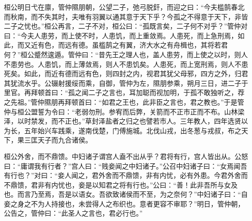 \documentclass[]{article}
\begin{document}
桓公明日弋在廪，管仲隰朋朝，公望二子，弛弓脱釬，而迎之曰：``今夫槛鹄春北而秋南，而不失其时，夫唯有羽翼以通其意于天下乎？今孤之不得意于天下，非皆二子之忧也。''桓公再言，二子不对，桓公曰：``孤既言矣，二子何不对乎？''管仲对曰：``今夫人患劳，而上使不时，人患饥，而上重敛焉。人患死，而上急刑焉，如此，而又近有色，而远有德。虽槛鹄之有翼，济大水之有舟楫也，其将若君何？''桓公蹙然逡遁。管仲曰：``昔先王之理人也，盖人患劳，而上使之以时，则人不患劳也。人患饥，而上薄敛焉，则人不患饥矣。人患死，而上宽刑焉，则人不患死矣。如此，而近有德而远有色，则四封之内，视君其犹父母邪，四方之外，归君其犹流水乎。公辍射援绥而乘，自御，管仲为左，隰朋参乘，朔月三日，进二子于里官。再拜顿首曰：``孤之闻二子之言也，耳加聪而视加明，于孤不敢独听之，荐之先祖。''管仲隰朋再拜顿首曰：``如君之王也，此非臣之言也，君之教也。''于是管仲与桓公盟誓为令曰：``老弱勿刑。参宥而后弊，关箭而不正市正而不布。山林梁泽，以时禁发，而不正也。''草封泽盐者之归之也譬若市人。三年教人，四年选贤以为长，五年始兴车践乘，遂南伐楚，门傅施城。北伐山戎，出冬葱与戎叔，布之天下，果三匡天子而九合诸侯。

桓公外舍，而不鼎馈。中妇诸子谓宫人盍不出从乎？君将有行，宫人皆出从。公怒曰：``庸谓我有行者？''宫人曰：``贱妾闻之中妇诸子。''公召中妇诸子曰：``女焉闻吾有行也？''对曰：``妾人闻之，君外舍而不鼎馈，非有内忧，必有外患。今君外舍而不鼎馈，君非有内忧也，妾是以知君之将有行也。''公曰：``善！此非吾所与女及也。而言乃至焉，吾是以语女。吾欲致诸侯而不至，为之奈何？''中妇诸子曰：``自妾之身之不为人持接也，未尝得人之布织也。意者更容不审耶？''明日，管仲朝，公告之，管仲曰：``此圣人之言也，君必行也。''
\end{document}

